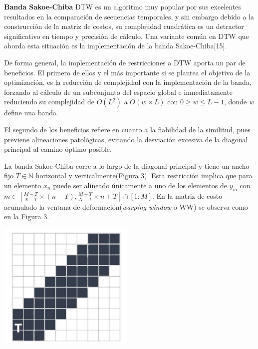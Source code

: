 \hfill\break
\justifying
\textbf{Banda Sakoe-Chiba}
	\hfill\break
	\justifying
	DTW es un algoritmo muy popular por sus excelentes resultados en la comparación de secuencias temporales, y sin embargo debido a la construcción de la matriz de costos, su complejidad cuadrática es un detractor significativo en tiempo y precisión de cálculo. Una variante común en DTW que aborda esta situación es la implementación de la banda Sakoe-Chiba[15].
	
	\hfill\break
	\justifying
	De forma general, la implementación de restricciones a DTW aporta un par de beneficios. El primero de ellos y el más importante si se plantea el objetivo de la optimización, es la reducción de complejidad con la implementación de la banda, forzando al cálculo de un subconjunto del espacio global e inmediatamente reduciendo su complejidad de $O(L^2)$ a $O(w\times L)$ con $0\geq w \leq L-1$, donde \textit{w} define una banda.
	
	\hfill\break
	\justifying
	El segundo de los beneficios refiere en cuanto a la fiabilidad de la similitud, pues previene alineaciones patológicas, evitando la desviación excesiva de la diagonal principal al camino óptimo posible.
	
	\hfill\break
	\justifying
	La banda Sakoe-Chiba corre a lo largo de la diagonal principal y tiene un ancho fijo $T \in \mathbb{N}$ horizontal y verticalmente(Figura 3). Esta restricción implica que para un elemento $x_n$ puede ser alineado únicamente a uno de los elementos de $y_m$ con $m \in \left[ \frac{M-T}{N-T} \times (n-T), \frac{M-T}{N-T} \times n+T \right] \cap [1:M]$. En la matriz de costo acumulado la ventana de deformación(\textit{warping window} o WW) se observa como en la Figura 3.
	
	\begin{minipage}{\linewidth}
		\centering
		\includegraphics[width=6.5cm]{Imagenes/sakoe-chiba.png}
	\end{minipage}

